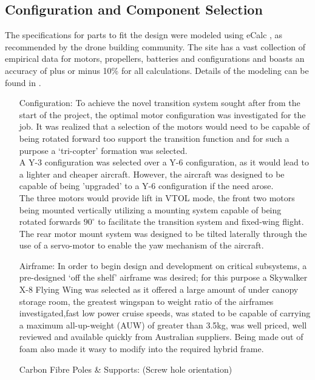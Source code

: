 \subsection{Configuration and Component Selection}
The specifications for parts to fit the design were modeled using eCalc , as recommended by the drone building community. The site has a vast collection of empirical data for motors, propellers, batteries and configurations and boasts an accuracy of plus or minus 10\% for all calculations. Details of the modeling can be found in .
	 \begin{itemize}
		\item[Configuration:] 	To achieve the novel transition system sought after from the start of the project, the optimal motor configuration was investigated for the job. It was realized that a selection of the motors would need to be capable of being rotated forward too support the transition function and for such a purpose a `tri-copter' formation was selected.\\
		A Y-3 configuration was selected over a Y-6 configuration, as it would lead to a lighter and cheaper aircraft. However, the aircraft was designed to be capable of being 'upgraded' to a Y-6 configuration if the need arose.\\
		The three motors would provide lift in VTOL mode, the front two motors being mounted vertically utilizing a mounting system capable of being rotated forwards $90^{\circ}$ to facilitate the transition system and fixed-wing flight. The rear motor mount system was designed to be tilted laterally through the use of a servo-motor to enable the yaw mechanism of the aircraft.\\
	
		\item[Airframe:] 	In order to begin design and development on critical subsystems, a pre-designed `off the shelf' airframe was desired; for this purpose a Skywalker X-8 Flying Wing was selected as it offered a large amount of under canopy storage room, the greatest wingspan to weight ratio of the airframes investigated,fast low power cruise speeds, was stated to be capable of carrying a maximum all-up-weight (AUW) of greater than 3.5kg, was  well priced, well reviewed and available quickly from Australian suppliers. Being made out of foam also made it wasy to modify into the required hybrid frame.
		
		\item[Carbon Fibre Poles \& Supports:] (Screw hole orientation)
		

\end{itemize}
